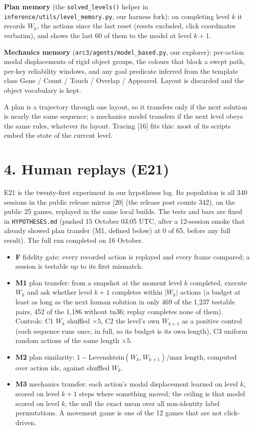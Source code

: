 \documentclass[
  11pt,
]{article}
\newcounter{none} %
\providecommand{\tightlist}{%
  \setlength{\itemsep}{0pt}\setlength{\parskip}{0pt}}
\begin{document}
\textbf{Plan memory} (the \texttt{solved\_levels()} helper in
\texttt{inference/utils/level\_memory.py}, our harness fork): on
completing level \(k\) it records \(W_k\), the actions since the last
reset (resets excluded, click coordinates verbatim), and shows the last
60 of them to the model at level \(k{+}1\).

\textbf{Mechanics memory} (\texttt{arc3/agents/model\_based.py}, our
explorer): per-action modal displacements of rigid object groups, the
colours that block a swept path, per-key reliability windows, and any
goal predicate inferred from the template class Gone / Count / Touch /
Overlap / Appeared. Layout is discarded and the object vocabulary is
kept.

A plan is a trajectory through one layout, so it transfers only if the
next solution is nearly the same sequence; a mechanics model transfers
if the next level obeys the same rules, whatever its layout. Tracing
{[}16{]} fits this: most of its scripts embed the state of the current
level.

\section{4. Human replays (E21)}\label{human-replays-e21}

E21 is the twenty-first experiment in our hypotheses log. Its population
is all 340 sessions in the public release mirror {[}20{]} (the release
post counts 342), on the public 25 games, replayed in the same local
builds. The tests and bars are fixed in \texttt{HYPOTHESES.md} (pushed
15 October 03:05 UTC, after a 12-session smoke that already showed plan
transfer (M1, defined below) at 0 of 65, before any full result). The
full run completed on 16 October.

\begin{itemize}
\tightlist
\item
  \textbf{F} fidelity gate: every recorded action is replayed and every
  frame compared; a session is testable up to its first mismatch.
\item
  \textbf{M1} plan transfer: from a snapshot at the moment level \(k\)
  completed, execute \(W_k\) and ask whether level \(k{+}1\) completes
  within \(|W_k|\) actions (a budget at least as long as the next human
  solution in only 469 of the 1,237 testable pairs, 452 of the 1,186
  without tn36; replay completes none of them). Controls: C1 \(W_k\)
  shuffled \(\times 5\), C2 the level's own \(W_{k+1}\) as a positive
  control (each sequence runs once, in full, so its budget is its own
  length), C3 uniform random actions of the same length \(\times 5\).
\item
  \textbf{M2} plan similarity:
  \(1 - \text{Levenshtein}(W_k, W_{k+1}) / \text{max length}\), computed
  over action ids, against shuffled \(W_k\).
\item
  \textbf{M3} mechanics transfer: each action's modal displacement
  learned on level \(k\), scored on level \(k{+}1\) steps where
  something moved; the ceiling is that model scored on level \(k\), the
  null the exact mean over all non-identity label permutations. A
  movement game is one of the 12 games that are not click-driven.
\end{itemize}
\end{document}
